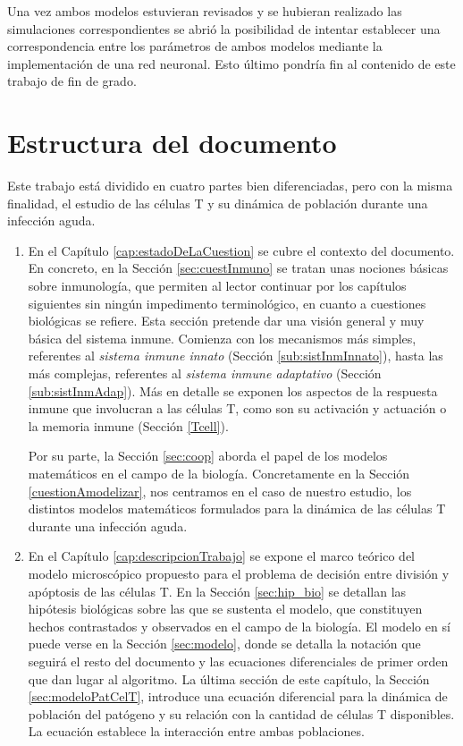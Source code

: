 Una vez ambos modelos estuvieran revisados y se hubieran realizado las simulaciones correspondientes se abrió la posibilidad de intentar establecer una correspondencia entre los parámetros de ambos modelos mediante la implementación de una red neuronal. Esto último pondría fin al contenido de este trabajo de fin de grado.


\section{Estructura del documento}

Este trabajo está dividido en cuatro partes bien diferenciadas, pero con la misma finalidad, el estudio de las células T y su dinámica de población durante una infección aguda. 

\begin{enumerate}
	\item En el Capítulo \ref{cap:estadoDeLaCuestion} se cubre el contexto del documento. En concreto, en la Sección \ref{sec:cuestInmuno} se tratan unas nociones básicas sobre inmunología, que permiten al lector continuar por los capítulos siguientes sin ningún impedimento terminológico, en cuanto a cuestiones biológicas se refiere. Esta sección pretende dar una visión general y muy básica del sistema inmune. Comienza con los mecanismos más simples, referentes al \textit{sistema inmune innato} (Sección \ref{sub:sistInmInnato}), hasta las más complejas, referentes al \textit{sistema inmune adaptativo} (Sección \ref{sub:sistInmAdap}). Más en detalle se exponen los aspectos de la respuesta inmune que involucran a las células T, como son su activación y actuación o la memoria inmune (Sección \ref{Tcell}). 
	
	Por su parte, la Sección \ref{sec:coop} aborda el papel de los modelos matemáticos en el campo de la biología. Concretamente en la Sección \ref{cuestionAmodelizar}, nos centramos en el caso de nuestro estudio, los distintos modelos matemáticos formulados para la dinámica de las células T durante una infección aguda.
	 
	
	\item En el Capítulo \ref{cap:descripcionTrabajo} se expone el marco teórico del modelo microscópico propuesto para el problema de decisión entre división y apóptosis de las células T. En la Sección \ref{sec:hip_bio} se detallan las hipótesis biológicas sobre las que se sustenta el modelo, que constituyen hechos contrastados y observados en el campo de la biología. El modelo en sí puede verse en la Sección \ref{sec:modelo}, donde se detalla la notación que seguirá el resto del documento y las ecuaciones diferenciales de primer orden que dan lugar al algoritmo. La última sección de este capítulo, la Sección \ref{sec:modeloPatCelT}, introduce una ecuación diferencial para la dinámica de población del patógeno y su relación con la cantidad de células T disponibles. La ecuación establece la interacción entre ambas poblaciones.
	

\end{enumerate}
